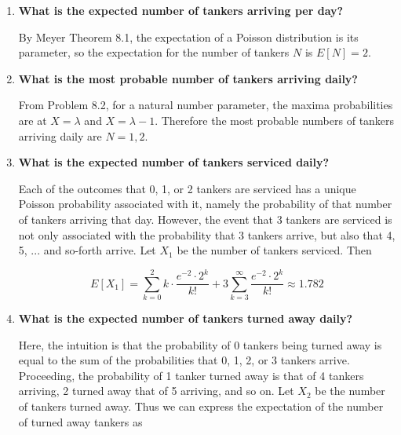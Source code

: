 \documentclass[10pt, oneside]{article}
\begin{document}
\begin{enumerate}[label=8.\arabic*]
\begin{enumerate}
	\item  \begin{tcolorbox}[
	  colback=Cerulean!5!white,
	  colframe=Cerulean!75!black]
	\textbf{What is the expected number of tankers arriving per day?}
	\end{tcolorbox}
	
	By Meyer Theorem 8.1, the expectation of a Poisson distribution is its parameter, so the expectation for the number of tankers $N$ is $\boxed{E[N] = 2}$.
	
	\item  \begin{tcolorbox}[
	  colback=Cerulean!5!white,
	  colframe=Cerulean!75!black]
	\textbf{What is the most probable number of tankers arriving daily?}
	\end{tcolorbox}
	
	From Problem 8.2, for a natural number parameter, the maxima probabilities are at $X = \lambda$ and $X = \lambda - 1$. Therefore the most probable numbers of tankers arriving daily are $\boxed{N = 1, 2}$.
	
	\item  \begin{tcolorbox}[
	  colback=Cerulean!5!white,
	  colframe=Cerulean!75!black]
	\textbf{What is the expected number of tankers serviced daily?}
	\end{tcolorbox}
	
	Each of the outcomes that 0, 1, or 2 tankers are serviced has a unique Poisson probability associated with it, namely the probability of that number of tankers arriving that day. However, the event that 3 tankers are serviced is not only associated with the probability that 3 tankers arrive, but also that 4, 5, ... and so-forth arrive. Let $X_1$ be the number of tankers serviced. Then
	
	\[ E[X_1] = \sum^2_{k = 0} k \cdot \frac{e^{-2} \cdot 2^k}{k!} + 3 \sum^{\infty}_{k = 3} \frac{e^{-2} \cdot 2^k}{k!} \approx \boxed{1.782} \]
	
	\item  \begin{tcolorbox}[
	  colback=Cerulean!5!white,
	  colframe=Cerulean!75!black]
	\textbf{What is the expected number of tankers turned away daily?}
	\end{tcolorbox}
	
	Here, the intuition is that the probability of 0 tankers being turned away is equal to the sum of the probabilities that 0, 1, 2, or 3 tankers arrive. Proceeding, the probability of 1 tanker turned away is that of 4 tankers arriving, 2 turned away that of 5 arriving, and so on. Let $X_2$ be the number of tankers turned away. Thus we can express the expectation of the number of turned away tankers as
	

\end{enumerate}
\end{enumerate}
\end{document}
